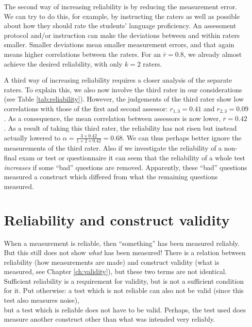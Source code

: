 \documentclass[
]{book}
\begin{document}
The second way of increasing reliability is by reducing the measurement
error. We can try to do this, for example, by instructing the raters as well as
possible
about how they should rate the students' language proficiency. An assessment
protocol and/or
instruction can make the deviations between and within raters smaller.
Smaller deviations mean smaller measurement errors, and that again means
higher correlations between the raters. For an
\(\overline{r}=0.8\), we already almost achieve the desired reliability, with
only \(k=2\) raters.

A third way of increasing reliability requires a closer analysis of
the separate raters. To explain this, we also now involve the third
rater in our considerations (see Table
\ref{tab:reliability}). However, the judgements of the third rater show
low correlations with those of the first and second
assessor: \(r_{1,3}=0.41\) and \(r_{2,3}=0.09\). As a consequence, the mean
correlation between assessors is now lower,
\(\overline{r}=0.42\). As a result of taking this third rater, the reliability
has not risen but instead actually lowered to
\(\alpha = \frac{3\times0.42}{1+2\times0.42} = 0.68\). We can thus
perhaps better ignore the measurements of the third rater.
Also if we investigate the reliability of a non-final exam or test or questionnaire
it can seem that the reliability of a whole test \emph{increases} if some
``bad'' questions are removed. Apparently, these ``bad'' questions measured
a construct which differed from what the remaining questions measured.

\hypertarget{reliability-and-construct-validity}{%
\section{Reliability and construct validity}\label{reliability-and-construct-validity}}

When a measurement is reliable, then ``something'' has been measured reliably.
But this still does not show \emph{what} has been measured! There is a
relation between reliability (how measurements are made) and construct
validity (what is measured, see
Chapter \ref{ch:validity}), but these two terms are not identical.
Sufficient reliability is a requirement for validity, but
is not a sufficient condition for it. Put otherwise: a test which
is not reliable can also not be valid (since this test also measures noise),\\
but a test which is reliable does not have to be valid.
Perhaps, the test used does measure another construct other than what
was intended very reliably.
\end{document}
